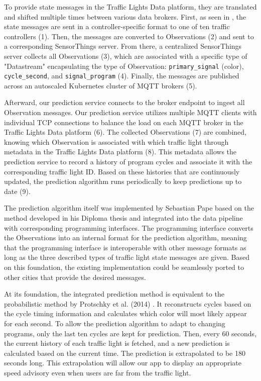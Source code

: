 To provide state messages in the Traffic Lights Data platform, they are translated and shifted multiple times between various data brokers. First, as seen in , the state messages are sent in a controller-specific format to one of ten traffic controllers (1). Then, the messages are converted to Observations (2) and sent to a corresponding SensorThings server. From there, a centralized SensorThings server collects all Observations (3), which are associated with a specific type of "Datastream" encapsulating the type of Observation: \texttt{primary\_signal} (color), \texttt{cycle\_second}, and \texttt{signal\_program} (4). Finally, the messages are published across an autoscaled Kubernetes cluster of MQTT brokers (5). 

Afterward, our prediction service connects to the broker endpoint to ingest all Observation messages. Our prediction service utilizes multiple MQTT clients with individual TCP connections to balance the load on each MQTT broker in the Traffic Lights Data platform (6). The collected Observations (7) are combined, knowing which Observation is associated with which traffic light through metadata in the Traffic Lights Data platform (8). This metadata allows the prediction service to record a history of program cycles and associate it with the corresponding traffic light ID. Based on these histories that are continuously updated, the prediction algorithm runs periodically to keep predictions up to date (9). 

The prediction algorithm itself was implemented by Sebastian Pape based on the method developed in his Diploma thesis \cite{pape_untersuchung_2012} and integrated into the data pipeline with corresponding programming interfaces. The programming interface converts the Observations into an internal format for the prediction algorithm, meaning that the programming interface is interoperable with other message formats as long as the three described types of traffic light state messages are given. Based on this foundation, the existing implementation could be seamlessly ported to other cities that provide the desired messages.

At its foundation, the integrated prediction method is equivalent to the probabilistic method by Protschky et al. (2014) \cite{protschky_extensive_2014, protschky_adaptive_2014}. It reconstructs cycles based on the cycle timing information and calculates which color will most likely appear for each second. To allow the prediction algorithm to adapt to changing programs, only the last ten cycles are kept for prediction. Then, every 60 seconds, the current history of each traffic light is fetched, and a new prediction is calculated based on the current time. The prediction is extrapolated to be 180 seconds long. This extrapolation will allow our app to display an appropriate speed advisory even when users are far from the traffic light. 


